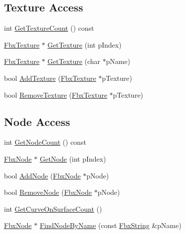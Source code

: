 \subsection*{Texture Access}
\begin{DoxyCompactItemize}
\item 
int \hyperlink{class_fbx_scene_a63041ec5c2a3f563c999ee1c20c71071}{Get\+Texture\+Count} () const
\item 
\hyperlink{class_fbx_texture}{Fbx\+Texture} $\ast$ \hyperlink{class_fbx_scene_a0636380a7984fd690eb37720b5cc4f9a}{Get\+Texture} (int p\+Index)
\item 
\hyperlink{class_fbx_texture}{Fbx\+Texture} $\ast$ \hyperlink{class_fbx_scene_ab7f5f7902a4a43b5c8688a590448e70c}{Get\+Texture} (char $\ast$p\+Name)
\item 
bool \hyperlink{class_fbx_scene_a19321c754cefd2a1576477d8e8353472}{Add\+Texture} (\hyperlink{class_fbx_texture}{Fbx\+Texture} $\ast$p\+Texture)
\item 
bool \hyperlink{class_fbx_scene_af802f5395ba0fcb72f13f2734ad17332}{Remove\+Texture} (\hyperlink{class_fbx_texture}{Fbx\+Texture} $\ast$p\+Texture)
\end{DoxyCompactItemize}
\subsection*{Node Access}
\begin{DoxyCompactItemize}
\item 
int \hyperlink{class_fbx_scene_a0cb1a1464b0fa1b8291c41900879515e}{Get\+Node\+Count} () const
\item 
\hyperlink{class_fbx_node}{Fbx\+Node} $\ast$ \hyperlink{class_fbx_scene_a1ba0a3d043284ae7c488467feaf1a9f9}{Get\+Node} (int p\+Index)
\item 
bool \hyperlink{class_fbx_scene_a4da84de06d868fd3542f4688834dff6d}{Add\+Node} (\hyperlink{class_fbx_node}{Fbx\+Node} $\ast$p\+Node)
\item 
bool \hyperlink{class_fbx_scene_a2e66ac740f8ff46ef58d0fb3dbbe5c65}{Remove\+Node} (\hyperlink{class_fbx_node}{Fbx\+Node} $\ast$p\+Node)
\item 
int \hyperlink{class_fbx_scene_a7dd5c89cc0d60a42ce504b2593f781cb}{Get\+Curve\+On\+Surface\+Count} ()
\item 
\hyperlink{class_fbx_node}{Fbx\+Node} $\ast$ \hyperlink{class_fbx_scene_ad0efe7531b777c959c690f57a3052706}{Find\+Node\+By\+Name} (const \hyperlink{class_fbx_string}{Fbx\+String} \&p\+Name)
\end{DoxyCompactItemize}
